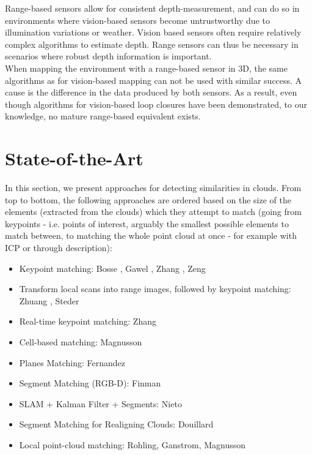 Range-based sensors allow for consistent depth-measurement, and can do so in environments where vision-based sensors become untrustworthy due to illumination variations or weather. Vision based sensors often require relatively complex algorithms to estimate depth. Range sensors can thus be necessary in scenarios where robust depth information is important.\\

When mapping the environment with a range-based sensor in 3D, the same algorithms as for vision-based mapping can not be used with similar success. A cause is the difference in the data produced by both sensors. As a result, even though algorithms for vision-based loop closures have been demonstrated, to our knowledge, no mature range-based equivalent exists.\\

\section{State-of-the-Art}
\label{sec:SOTA}

In this section, we present approaches for detecting similarities in clouds. From top to bottom, the following approaches are ordered based on the size of the elements (extracted from the clouds) which they attempt to match (going from keypoints - i.e. points of interest, arguably the smallest possible elements to match between, to matching the whole point cloud at once - for example with ICP or through description):

\begin{itemize}
  \item{Keypoint matching: Bosse \cite{bosse2013place}, Gawel \cite{Gawel2016}, Zhang \cite{zhang2014loam}, Zeng \cite{zeng20163dmatch}}
\item{Transform local scans into range images, followed by keypoint matching: Zhuang \cite{zhuang20133},  Steder \cite{steder2010robust, steder2011place}}
  \item{Real-time keypoint matching: Zhang \citet{zhang2014loam}}
  \item{Cell-based matching: Magnusson \cite{magnusson2009automatic}}
  \item{Planes Matching: Fernandez \cite{fernandez2013fast, fernandez2016scene}}
  \item{Segment Matching (RGB-D): Finman \cite{finman2015icraws}}
  \item{SLAM + Kalman Filter + Segments: Nieto \cite{nieto2006scan}}
  \item{Segment Matching for Realigning Clouds: Douillard \cite{douillard2012scan, douillard2014pipeline}}
  \item{Local point-cloud matching: Rohling, Ganstrom, Magnusson \cite{rohling2015fast, granstrom2011learning,magnusson2009automatic}}
\end{itemize}

